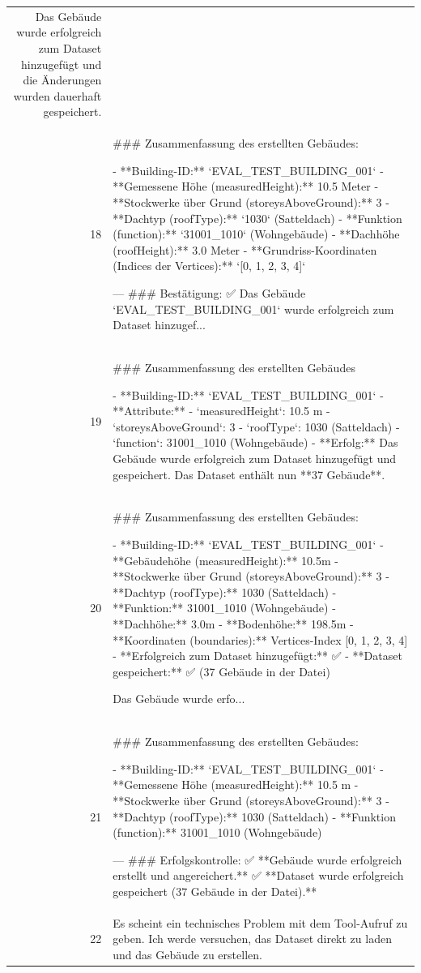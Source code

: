 \documentclass[a4paper,11pt]{article}
\begin{document}
\begin{table}[ht]
\begin{tabular}{r p{12cm}}
Das Gebäude wurde erfolgreich zum Dataset hinzugefügt und die Änderungen wurden dauerhaft gespeichert. \\
18 & \#\#\# Zusammenfassung des erstellten Gebäudes:

- **Building-ID:** `EVAL\_TEST\_BUILDING\_001`
- **Gemessene Höhe (measuredHeight):** 10.5 Meter
- **Stockwerke über Grund (storeysAboveGround):** 3
- **Dachtyp (roofType):** `1030` (Satteldach)
- **Funktion (function):** `31001\_1010` (Wohngebäude)
- **Dachhöhe (roofHeight):** 3.0 Meter
- **Grundriss-Koordinaten (Indices der Vertices):** `[0, 1, 2, 3, 4]`

---
\#\#\# Bestätigung:
✅ Das Gebäude `EVAL\_TEST\_BUILDING\_001` wurde erfolgreich zum Dataset hinzugef... \\
19 & \#\#\# Zusammenfassung des erstellten Gebäudes

- **Building-ID:** `EVAL\_TEST\_BUILDING\_001`
- **Attribute:**
  - `measuredHeight`: 10.5 m
  - `storeysAboveGround`: 3
  - `roofType`: 1030 (Satteldach)
  - `function`: 31001\_1010 (Wohngebäude)
- **Erfolg:** Das Gebäude wurde erfolgreich zum Dataset hinzugefügt und gespeichert. Das Dataset enthält nun **37 Gebäude**. \\
20 & \#\#\# Zusammenfassung des erstellten Gebäudes:

- **Building-ID:** `EVAL\_TEST\_BUILDING\_001`
- **Gebäudehöhe (measuredHeight):** 10.5m
- **Stockwerke über Grund (storeysAboveGround):** 3
- **Dachtyp (roofType):** 1030 (Satteldach)
- **Funktion:** 31001\_1010 (Wohngebäude)
- **Dachhöhe:** 3.0m
- **Bodenhöhe:** 198.5m
- **Koordinaten (boundaries):** Vertices-Index [0, 1, 2, 3, 4]
- **Erfolgreich zum Dataset hinzugefügt:** ✅
- **Dataset gespeichert:** ✅ (37 Gebäude in der Datei)

Das Gebäude wurde erfo... \\
21 & \#\#\# Zusammenfassung des erstellten Gebäudes:

- **Building-ID:** `EVAL\_TEST\_BUILDING\_001`
- **Gemessene Höhe (measuredHeight):** 10.5 m
- **Stockwerke über Grund (storeysAboveGround):** 3
- **Dachtyp (roofType):** 1030 (Satteldach)
- **Funktion (function):** 31001\_1010 (Wohngebäude)

---
\#\#\# Erfolgskontrolle:
✅ **Gebäude wurde erfolgreich erstellt und angereichert.**
✅ **Dataset wurde erfolgreich gespeichert (37 Gebäude in der Datei).** \\
22 & Es scheint ein technisches Problem mit dem Tool-Aufruf zu geben. Ich werde versuchen, das Dataset direkt zu laden und das Gebäude zu erstellen.


\end{tabular}
\end{table}
\end{document}
